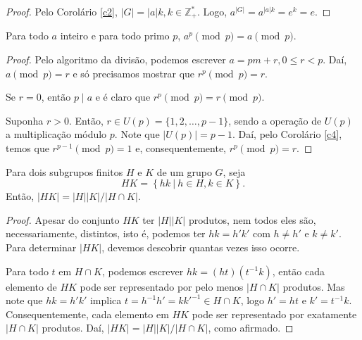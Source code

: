 	\begin{proof}
		Pelo Corolário \ref{c2}, $|G| = |a| k, k\in\mathbb{Z}_{+}^{*}$.
		Logo, $a^{|G|} = a^{|a|k} = e^k = e$. 
	\end{proof}
	\begin{corollary}
	\label{c5}
		Para todo $a$ inteiro e para todo primo $p$, $a^p \pmod p = a\pmod p$.
	\end{corollary}
	\begin{proof}
		Pelo algoritmo da divisão, podemos escrever $a = pm + r, 0\leq r < p$.
		Daí, $a\pmod p = r$ e só precisamos mostrar que $r^p\pmod p = r$.
		\par\vspace{0.3cm} Se $r = 0$, então $p\mid a$ e é claro que 
		$r^p\pmod p = r\pmod p$.
		\par\vspace{0.3cm} Suponha $r>0$. Então, 
		$r\in U(p) = \{1, 2, \dots, p-1\}$, sendo a operação de $U(p)$ a
		multiplicação módulo $p$. Note que $|U(p)| = p-1$. Daí, pelo
		Corolário \ref{c4}, temos que $r^{p-1}\pmod p = 1$ e,
		consequentemente, $r^p\pmod p = r$. 
	\end{proof}
	\begin{theorem}
	\label{ordem de HK}
		Para dois subgrupos finitos $H$ e $K$ de um grupo $G$, seja 
		\[
		HK = \left\{ hk \ | \ h\in H, k\in K \right\}.
		\]
		Então, 
		$|HK| = |H||K|/|H\cap K|$.
	\end{theorem}
	\begin{proof}
		Apesar do conjunto $HK$ ter $|H||K|$ produtos, nem todos eles são,
		necessariamente, distintos, isto é, podemos ter $hk = h'k'$ com 
		$h\neq h'$ e $k\neq k'$. Para determinar $|HK|$, devemos descobrir
		quantas vezes isso ocorre.
		\par\vspace{0.3cm} Para todo $t$ em $H\cap K$, podemos escrever 
		$hk = (ht)(t^{-1}k)$, então cada elemento de $HK$ pode ser
		representado por pelo menos $|H\cap K|$ produtos. Mas note que 
		$hk = h'k'$ implica $t = h^{-1}h' = kk'^{-1}\in H\cap K$, logo 
		$h' = ht$ e $k' = t^{-1}k$. Consequentemente, cada elemento em $HK$
		pode ser representado por exatamente $|H\cap K|$ produtos. Daí, 
		$|HK| = |H||K|/|H\cap K|$, como afirmado.
	\end{proof}
